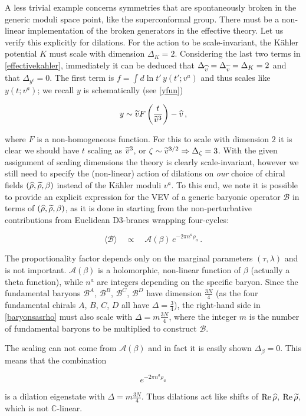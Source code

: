 A less trivial example concerns symmetries that are spontaneously broken in the generic moduli space point, like the superconformal group. There must be a non-linear implementation of the broken generators in the effective theory. Let us verify this explicitly for dilations. For the action to be scale-invariant, the K\"ahler potential $K$ must scale with dimension $\Delta_K = 2$. Considering the last two terms in \eqref{effectivekahler}, immediately it can be deduced that $\Delta_{\widehat{v}} = \Delta_{\widetilde{v}} = \Delta_K = 2$ and that $\Delta_{y^i}=0$. The first term is $f = \int d\ln t' \, y(t';v^a)$ and thus scales like $y(t;v^a)$; we recall $y$ is schematically (see \eqref{yfun})

\begin{equation}
	y \sim \widetilde{v} F\left( \frac{t}{{\widetilde{v}}^3} \right) - \widehat{v}\,,
	\label{}
\end{equation}

where $F$ is a non-homogeneous function. For this to scale with dimension $2$ it is clear we should have $t$ scaling as $\widetilde{v}^3$, or $\zeta \sim {\ensuremath{\widetilde{v}}}^{3/2} \Rightarrow \Delta_\zeta = 3$. With the given assignment of scaling dimensions the theory is clearly scale-invariant, however we still need to specify the (non-linear) action of dilations on \emph{our} choice of chiral fields $(\widehat{\rho},\widetilde{\rho},\beta)$ instead of the K\"ahler moduli $v^a$. To this end, we note it is possible to provide an explicit expression for the VEV of a generic baryonic operator $\mathcal{B}$ in terms of $(\widehat{\rho}, \widetilde{\rho}, \beta)$, as it is done in \cite{MZ} starting from the non-perturbative contributions from Euclidean D3-branes wrapping four-cycles:

\begin{equation}
	\langle \mathcal{B} \rangle \quad \propto \quad \mathcal{A}(\beta) \, e^{-2\pi n^a \rho_a}\,.
	\label{baryonsasrho}
\end{equation}

The proportionality factor depends only on the marginal parameters $(\tau,\lambda)$ and is not important. $\mathcal{A}(\beta)$ is a holomorphic, non-linear function of $\beta$ (actually a theta function), while $n^a$ are integers depending on the specific baryon. Since the fundamental baryons $\mathcal{B}^A$, $\mathcal{B}^B$, $\mathcal{B}^C$, $\mathcal{B}^D$ have dimension $\frac{3N}{4}$ (as the four fundamental chirals $A$, $B$, $C$, $D$ all have $\Delta = \frac{3}{4}$), the right-hand side in \eqref{baryonsasrho} must also scale with $\Delta = m\frac{3N}{4}$, where the integer $m$ is the number of fundamental baryons to be multiplied to construct $\mathcal{B}$.

The scaling can not come from $\mathcal{A}(\beta)$ and in fact it is easily shown $\Delta_\beta = 0$. This means that the combination

\begin{equation}
	e^{-2\pi n^a \rho_a}
	\label{}
\end{equation}

is a dilation eigenstate with $\Delta = m\frac{3N}{4}$. Thus dilations act like shifts of $\operatorname{Re} \widehat{\rho}$, $\operatorname{Re} \widetilde{\rho}$, which is not $\mathbb{C}$-linear.



